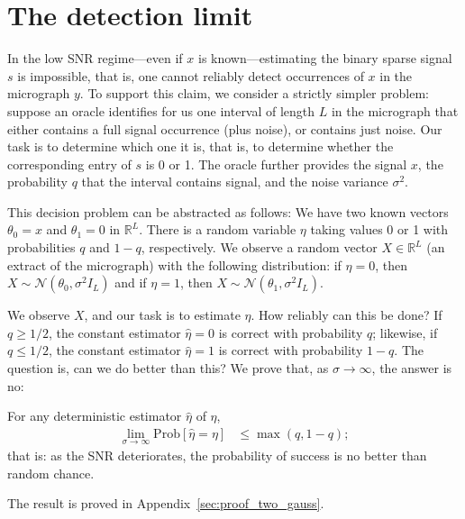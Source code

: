 \documentclass[9pt,twocolumn,twoside,lineno]{pnas-new}
\renewcommand{\P}{\mathrm{Prob}}
\begin{document}
\section{The detection limit} \label{sec:detectionlimit}
In the low SNR regime---even if $x$ is known---estimating the binary sparse signal $s$ is impossible, that is, one cannot reliably detect occurrences of $x$ in the micrograph $y$.
To support this claim, we consider a strictly simpler problem: suppose an oracle identifies for us one interval of length $L$ in the micrograph that either contains a full signal occurrence (plus noise), or contains just noise. Our task is to determine which one it is, that is, to determine whether the corresponding entry of $s$ is 0 or 1.
The oracle further provides the signal $x$, the probability $q$ that  the interval contains signal, and the noise variance $\sigma^2$. 

This decision problem can be abstracted as follows: We have two known vectors $\theta_0 = x$ and $\theta_1 = 0$ in $\mathbb{R}^L$. There is a random variable $\eta$ taking values 0 or 1 with probabilities $q$ and $1-q$, respectively. We observe a random vector $X \in \mathbb{R}^L$ (an extract of the micrograph) with the following distribution: if $\eta = 0$, then $X \sim \mathcal N(\theta_0,\sigma^2I_L)$ and if $\eta = 1$, then $X \sim \mathcal N(\theta_1,\sigma^2I_L)$. 

We observe $X$, and our task is to estimate $\eta$. How reliably can this be done? If $q \geq 1/2$, the constant estimator $\hat{\eta} = 0$ is correct with probability $q$; likewise, if $q \leq 1/2$, the constant estimator $\hat{\eta} = 1$ is correct with probability $1-q$. The question is, can we do better than this?  We prove that, as $\sigma \to \infty$, the answer is no:
\begin{proposition} \label{prop:two_gauss}
	For any deterministic estimator $\hat{\eta }$ of $\eta$,
	\begin{align*}
	\lim_{\sigma \to \infty} \P[ \hat{\eta} = \eta  ] & \leq \max(q, 1-q);
	\end{align*}
	that is: as the SNR deteriorates, the probability of success is no better than random chance.
\end{proposition}
\noindent The result is proved in Appendix~\ref{sec:proof_two_gauss}.
\end{document}
